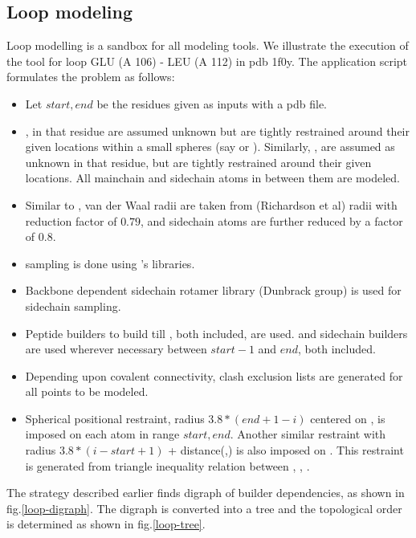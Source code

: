\documentclass{article}[14pts]
\begin{document}
\subsection{Loop modeling}
Loop modelling is a sandbox for all modeling tools. We illustrate the execution of the tool for loop GLU (A 106) - LEU (A 112) in pdb 1f0y. The application script formulates the problem as follows:
\begin{itemize}
\item Let $start, end$ be the residues given as inputs with a pdb file.
\item {},  in that residue are assumed unknown but are tightly restrained around their given locations within a small spheres (say  or ).
Similarly, ,  are assumed as unknown in that residue, but are tightly restrained around their given locations. All mainchain and sidechain atoms in between them are modeled.
\item Similar to \rapper, van der Waal radii are taken from \probe (Richardson et al) radii with reduction factor of $0.79$, and sidechain atoms are further reduced by a factor of $0.8$.
\item \phipsi sampling is done using \rapper's \phipsi libraries.
\item Backbone dependent sidechain rotamer library (Dunbrack group) is used for sidechain sampling.
\item Peptide builders to build  till , both included, are used. \CB{} and sidechain builders are used wherever necessary between $start-1$ and $end$, both included.
\item Depending upon covalent connectivity, clash exclusion lists are generated for all points to be modeled.
\item Spherical positional restraint, radius $3.8 * (end+1-i)$ centered on , is imposed on each  atom in range $start, end$. Another similar restraint with radius $3.8 * (i-start+1)$ + distance(,) is also imposed on . This restraint is generated from triangle inequality relation between , , .
\end{itemize}

The strategy described earlier finds digraph of builder dependencies, as shown in fig.\ref{loop-digraph}. The digraph is converted into a tree and the topological order is determined as shown in fig.\ref{loop-tree}.

\end{document}
